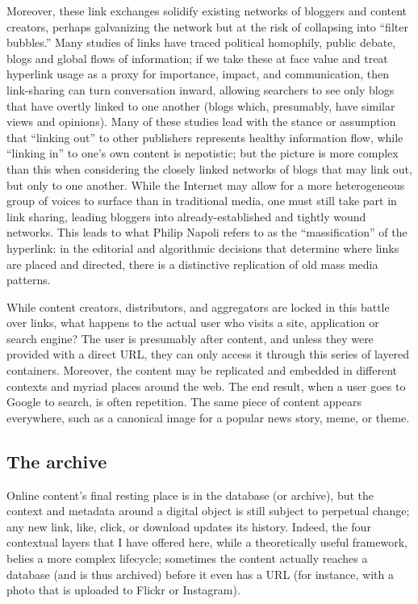 Moreover, these link exchanges solidify existing networks of bloggers and content creators, perhaps galvanizing the network but at the risk of collapsing into ``filter bubbles.'' Many studies of links have traced political homophily, public debate, blogs and global flows of information; if we take these at face value and treat hyperlink usage as a proxy for importance, impact, and communication, then link-sharing can turn conversation inward, allowing searchers to see only blogs that have overtly linked to one another (blogs which, presumably, have similar views and opinions).\autocite[See][]{graells-garrido_data_2013} Many of these studies lead with the stance or assumption that ``linking out'' to other publishers represents healthy information flow, while ``linking in'' to one's own content is nepotistic; but the picture is more complex than this when considering the closely linked networks of blogs that may link out, but only to one another. While the Internet may allow for a more heterogeneous group of voices to surface than in traditional media, one must still take part in link sharing, leading bloggers into already-established and tightly wound networks. This leads to what Philip Napoli refers to as the ``massification'' of the hyperlink: in the editorial and algorithmic decisions that determine where links are placed and directed, there is a distinctive replication of old mass media patterns.\autocite{tsui_hyperlinking_2008}

While content creators, distributors, and aggregators are locked in this battle over links, what happens to the actual user who visits a site, application or search engine? The user is presumably after content, and unless they were provided with a direct URL, they can only access it through this series of layered containers. Moreover, the content may be replicated and embedded in different contexts and myriad places around the web. The end result, when a user goes to Google to search, is often repetition. The same piece of content appears everywhere, such as a canonical image for a popular news story, meme, or theme.

\subsection{The archive}

Online content's final resting place is in the database (or archive), but the context and metadata around a digital object is still subject to perpetual change; any new link, like, click, or download updates its history. Indeed, the four contextual layers that I have offered here, while a theoretically useful framework, belies a more complex lifecycle; sometimes the content actually reaches a database (and is thus archived) before it even has a URL (for instance, with a photo that is uploaded to Flickr or Instagram).

